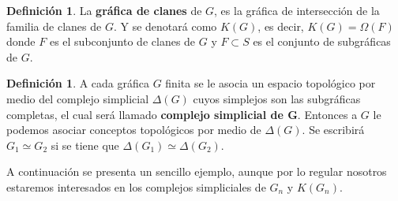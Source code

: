 \documentclass[12pt]{book}
\theoremstyle{definition}
\newtheorem{definition}[theorem]{Definición}
\newcounter{in}
\newcounter{ini}
\begin{document}
\begin{definition}
  \label{clique_graph}
  La \textbf{gráfica de clanes} de $G$, es la gráfica de intersección
  de la familia de clanes de $G$. Y se denotará como $K(G)$, es decir, $K(G) = \Omega(F)$ donde $F$ es el subconjunto de clanes de $G$ y $F \subset S$ es el conjunto de subgráficas de $G$.
\end{definition}
\begin{definition}
A cada gráfica $G$ finita se le asocia un espacio topológico por medio
del complejo simplicial $\Delta(G)$ cuyos simplejos son las
subgráficas completas, el cual será llamado \textbf{complejo simplicial de $\boldsymbol{G}$}. Entonces a $G$ le podemos asociar conceptos
topológicos por medio de $\Delta(G)$. Se escribirá
$G_{1} \simeq G_{2}$ si se tiene que
$\Delta(G_{1}) \simeq \Delta(G_{2})$. 
\end{definition}
A continuación se presenta un sencillo ejemplo, aunque por lo regular nosotros estaremos interesados en los complejos simpliciales de $G_{n}$ y $K(G_{n})$.
\end{document}
